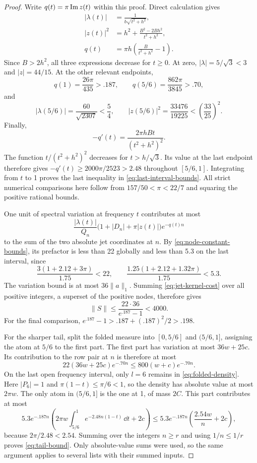 \begin{proof}
Write \(q(t)=\pi\operatorname{Im} z(t)\) within this proof.  Direct calculation gives
\begin{align*}
 |\lambda(t)|&=\frac1{b\sqrt{t^2+h^2}},\\
 |z(t)|^2&=h^2+\frac{B^2-2Bh^2}{t^2+h^2},\\
 q(t)&=\pi h\left(\frac{B}{t^2+h^2}-1\right).
\end{align*}
Since \(B>2h^2\), all three expressions decrease for \(t\ge0\).  At zero,
\(|\lambda|=5/\sqrt3<3\) and \(|z|=44/15\).  At the other relevant endpoints,
\[
 q(1)=\frac{26\pi}{435}>.187,\qquad
 q(5/6)=\frac{862\pi}{3845}>.70,
\]
and
\[
 |\lambda(5/6)|=\frac{60}{\sqrt{2307}}<\frac54,
 \qquad
 |z(5/6)|^2=\frac{33476}{19225}<\left(\frac{33}{25}\right)^2.
\]
Finally,
\[
 -q'(t)=\frac{2\pi hBt}{(t^2+h^2)^2}.
\]
The function \(t/(t^2+h^2)^2\) decreases for \(t>h/\sqrt3\).  Its value at
the last endpoint therefore gives \(-q'(t)\ge2000\pi/2523>2.48\) throughout
\([5/6,1]\).  Integrating from \(t\) to 1 proves the last inequality in
\eqref{eq:last-interval-bounds}.  All strict numerical comparisons here
follow from \(157/50<\pi<22/7\) and squaring the positive rational bounds.

One unit of spectral variation at frequency \(t\) contributes at most
\begin{equation}\label{eq:jet-kernel-cost}
 \frac{|\lambda(t)|}{Q_n}
       \bigl(1+|D_n|+\pi|z(t)|\bigr)e^{-q(t)n}
\end{equation}
to the sum of the two absolute jet coordinates at \(n\).  By
\eqref{eq:node-constant-bounds}, its prefactor is less than 22 globally and
less than 5.3 on the last interval, since
\[
 \frac{3(1+2.12+3\pi)}{1.75}<22,
 \qquad
 \frac{1.25(1+2.12+1.32\pi)}{1.75}<5.3.
\]
The variation bound is at most \(36\|a\|_1\).  Summing
\eqref{eq:jet-kernel-cost} over all positive integers, a superset of the
positive nodes, therefore gives
\[
 \|S\|\le\frac{22\cdot36}{e^{.187}-1}<4000.
\]
For the final comparison, \(e^{.187}-1>.187+(.187)^2/2>.198\).

For the sharper tail, split the folded measure into \([0,5/6]\) and
\((5/6,1]\), assigning the atom at \(5/6\) to the first part.  The first part
has variation at most \(36w+25c\).  Its contribution to the row pair at \(n\)
is therefore at most
\[
 22(36w+25c)e^{-.70n}\le800(w+c)e^{-.70n}.
\]
On the last open frequency interval, only \(l=6\) remains in
\eqref{eq:folded-density}.  Here \(|P_6|=1\) and
\(\pi(1-t)\le\pi/6<1\), so the density has absolute value at most \(2\pi w\).
The only atom in \((5/6,1]\) is the one at 1, of mass \(2C\).  This part
contributes at most
\[
 5.3e^{-.187n}
       \left(2\pi w\int_{5/6}^1e^{-2.48n(1-t)}\,\dd t+2c\right)
 \le5.3e^{-.187n}\left(\frac{2.54w}{n}+2c\right),
\]
because \(2\pi/2.48<2.54\).  Summing over the integers \(n\ge r\) and using
\(1/n\le1/r\) proves \eqref{eq:tail-bound}.  Only absolute-value sums were
used, so the same argument applies to several lists with their summed inputs.
\end{proof}

